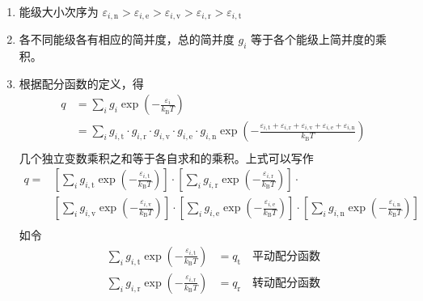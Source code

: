 \begin{enumerate}
    \item 能级大小次序为 $\varepsilon_{i,\mathrm{n}} > \varepsilon_{i,\mathrm{e}} > \varepsilon_{i,\mathrm{v}} > \varepsilon_{i,\mathrm{r}} > \varepsilon_{i,\mathrm{t}}$
    \item 各不同能级各有相应的简并度，总的简并度 $g_i$ 等于各个能级上简并度的乘积。
    \item 根据配分函数的定义，得
    \begin{equation*}
        \begin{aligned}
            q &= \sum_{i} g_i \exp\left(-\frac{\varepsilon_i}{k_\mathrm{B} T}\right) \\
            &= \sum_{i} g_{i,\mathrm{t}} \cdot g_{i,\mathrm{r}} \cdot g_{i,\mathrm{v}} \cdot g_{i,\mathrm{e}} \cdot g_{i,\mathrm{n}} \exp\left(-\frac{\varepsilon_{i,\mathrm{t}} + \varepsilon_{i,\mathrm{r}} + \varepsilon_{i,\mathrm{v}} + \varepsilon_{i,\mathrm{e}} + \varepsilon_{i,\mathrm{n}}}{k_\mathrm{B} T}\right) \\
        \end{aligned}
    \end{equation*}
    几个独立变数乘积之和等于各自求和的乘积。上式可以写作
    \begin{equation}
        \begin{aligned}
            q = &\left[\sum_{i} g_{i,\mathrm{t}} \exp\left(-\frac{\varepsilon_{i,\mathrm{t}}}{k_\mathrm{B} T}\right)\right] \cdot
            \left[\sum_{i} g_{i,\mathrm{r}} \exp\left(-\frac{\varepsilon_{i,\mathrm{r}}}{k_\mathrm{B} T}\right)\right] \cdot \\
            &\left[\sum_{i} g_{i,\mathrm{v}} \exp\left(-\frac{\varepsilon_{i,\mathrm{v}}}{k_\mathrm{B} T}\right)\right] \cdot
            \left[\sum_{i} g_{i,\mathrm{e}} \exp\left(-\frac{\varepsilon_{i,\mathrm{e}}}{k_\mathrm{B} T}\right)\right] \cdot
            \left[\sum_{i} g_{i,\mathrm{n}} \exp\left(-\frac{\varepsilon_{i,\mathrm{n}}}{k_\mathrm{B} T}\right)\right] \\
            \label{PartitionProd}
        \end{aligned}
    \end{equation}
    如令
    \begin{equation*}
        \begin{aligned}
            \sum_{i} g_{i,\mathrm{t}} \exp\left(-\frac{\varepsilon_{i,\mathrm{t}}}{k_\mathrm{B} T}\right) &= q_\mathrm{t} \quad \text{平动配分函数} \\
            \sum_{i} g_{i,\mathrm{r}} \exp\left(-\frac{\varepsilon_{i,\mathrm{r}}}{k_\mathrm{B} T}\right) &= q_\mathrm{r} \quad \text{转动配分函数} \\

\end{aligned}
\end{equation*}
\end{enumerate}
